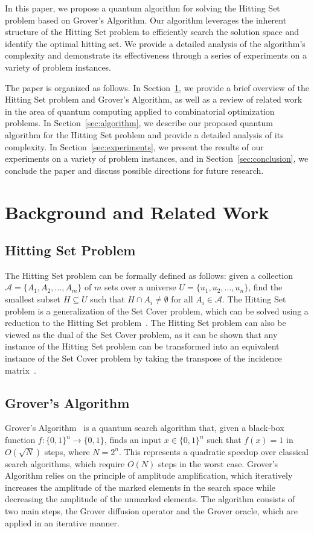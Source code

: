 In this paper, we propose a quantum algorithm for solving the Hitting Set problem based on Grover's Algorithm. Our algorithm leverages the inherent structure of the Hitting Set problem to efficiently search the solution space and identify the optimal hitting set. We provide a detailed analysis of the algorithm's complexity and demonstrate its effectiveness through a series of experiments on a variety of problem instances.

The paper is organized as follows. In Section~\ref{sec:background}, we provide a brief overview of the Hitting Set problem and Grover's Algorithm, as well as a review of related work in the area of quantum computing applied to combinatorial optimization problems. In Section~\ref{sec:algorithm}, we describe our proposed quantum algorithm for the Hitting Set problem and provide a detailed analysis of its complexity. In Section~\ref{sec:experiments}, we present the results of our experiments on a variety of problem instances, and in Section~\ref{sec:conclusion}, we conclude the paper and discuss possible directions for future research.

\section{Background and Related Work}\label{sec:background}
\subsection{Hitting Set Problem}
The Hitting Set problem can be formally defined as follows: given a collection $\mathcal{A} = \{A_1, A_2, \dots, A_m\}$ of $m$ sets over a universe $U = \{u_1, u_2, \dots, u_n\}$, find the smallest subset $H \subseteq U$ such that $H \cap A_i \neq \emptyset$ for all $A_i \in \mathcal{A}$. The Hitting Set problem is a generalization of the Set Cover problem, which can be solved using a reduction to the Hitting Set problem~\cite{vazirani2013approximation}. The Hitting Set problem can also be viewed as the dual of the Set Cover problem, as it can be shown that any instance of the Hitting Set problem can be transformed into an equivalent instance of the Set Cover problem by taking the transpose of the incidence matrix~\cite{vazirani2013approximation}.

\subsection{Grover's Algorithm}
Grover's Algorithm~\cite{grover1996fast} is a quantum search algorithm that, given a black-box function $f:\{0,1\}^n\rightarrow\{0,1\}$, finds an input $x\in\{0,1\}^n$ such that $f(x)=1$ in $O(\sqrt{N})$ steps, where $N=2^n$. This represents a quadratic speedup over classical search algorithms, which require $O(N)$ steps in the worst case. Grover's Algorithm relies on the principle of amplitude amplification, which iteratively increases the amplitude of the marked elements in the search space while decreasing the amplitude of the unmarked elements. The algorithm consists of two main steps, the Grover diffusion operator and the Grover oracle, which are applied in an iterative manner.

